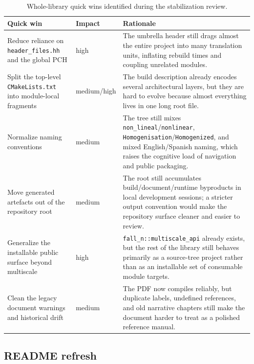 \begin{table}[htb]
\centering
\small
\begin{tabular}{p{}p{}p{}}
\toprule
Quick win & Impact & Rationale \\
\midrule
Reduce reliance on \texttt{header\_files.hh} and the global PCH &
high &
The umbrella header still drags almost the entire project into many
translation units, inflating rebuild times and coupling unrelated modules. \\
Split the top-level \texttt{CMakeLists.txt} into module-local fragments &
medium/high &
The build description already encodes several architectural layers, but they
are hard to evolve because almost everything lives in one long root file. \\
Normalize naming conventions &
medium &
The tree still mixes \texttt{non\_lineal}/\texttt{nonlinear},
\texttt{Homogenisation}/\texttt{Homogenized}, and mixed English/Spanish naming,
which raises the cognitive load of navigation and public packaging. \\
Move generated artefacts out of the repository root &
medium &
The root still accumulates build/document/runtime byproducts in local
development sessions; a stricter output convention would make the repository
surface cleaner and easier to review. \\
Generalize the installable public surface beyond multiscale &
high &
\texttt{fall\_n::multiscale\_api} already exists, but the rest of the library
still behaves primarily as a source-tree project rather than as an installable
set of consumable module targets. \\
Clean the legacy document warnings and historical drift &
medium &
The PDF now compiles reliably, but duplicate labels, undefined references, and
old narrative chapters still make the document harder to treat as a polished
reference manual. \\
\bottomrule
\end{tabular}
\caption{Whole-library quick wins identified during the stabilization review.}
\label{tab:ms-stab-library-quickwins}
\end{table}

\subsection{README refresh}

